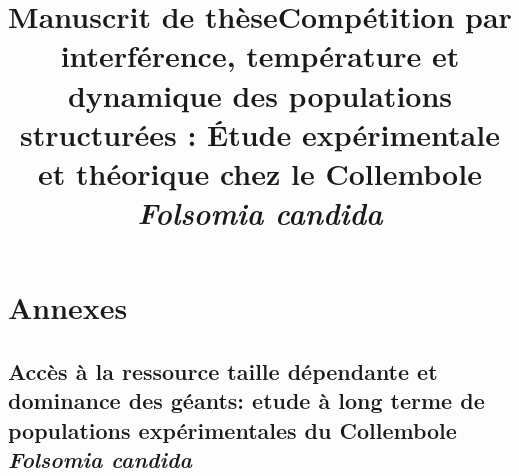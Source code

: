 \documentclass[12pt,a4paper,twoside,openright,final]{memoir}
\title{Manuscrit de thèse}
\begin{document}
\frontmatter




\begin{Spacing}{1}





\tableofcontents

\end{Spacing}


\mainmatter

\title{Compétition par interférence, température et dynamique des populations
structurées : \'Etude expérimentale et théorique chez le Collembole
\textit{Folsomia candida}}
\newpage

 

\part{Annexes}
\appendix


% 



%
% 

\chapter[Accès à la ressource taille dépendante et dominance
des géants: etude à long terme de populations expérimentales du Collembole
\textit{Folsomia candida}][Etude à long terme]{Accès à la ressource taille
dépendante et dominance des géants: etude à long terme de populations
expérimentales du Collembole
\textit{Folsomia candida}}\label{chap:3-1}




\end{document}
